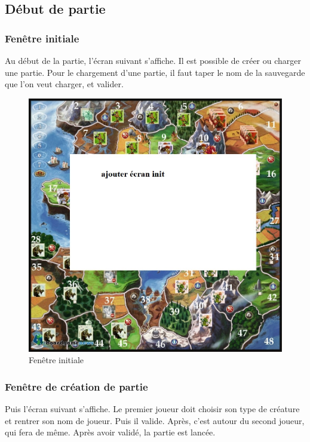 \subsection{Début de partie}

\subsubsection{Fenêtre initiale}
Au début de la partie, l'écran suivant s'affiche. Il est possible de créer ou charger une partie. Pour le chargement d'une partie, il faut taper le nom de la sauvegarde que l'on veut charger, et valider.

\begin{figure}[ht!]
\centering
\includegraphics[scale=0.40]{img/init.jpg}
\caption{Fenêtre initiale}
\end{figure}

\subsubsection{Fenêtre de création de partie}
Puis l'écran suivant s'affiche. Le premier joueur doit choisir son type de créature et rentrer son nom de joueur. Puis il valide. Après, c'est autour du second joueur, qui fera de même. Après avoir validé, la partie est lancée.


